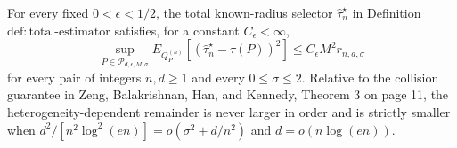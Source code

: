For every fixed \(0<\epsilon<1/2\), the total known-radius selector \(\widehat\tau_n^{\star}\) in Definition~\(\mathrm{def:total\text{-}estimator}\) satisfies, for a constant \(C_{\epsilon}<\infty\),
\[
 \sup_{P\in\mathcal P_{d,\epsilon,M,\sigma}}
 E_{Q_P^{(n)}}[(\widehat\tau_n^{\star}-\tau(P))^2]
 \le C_{\epsilon}M^2r_{n,d,\sigma}
\]
for every pair of integers \(n,d\ge1\) and every \(0\le\sigma\le2\).  Relative to the collision guarantee in Zeng, Balakrishnan, Han, and Kennedy, Theorem 3 on page 11, the heterogeneity-dependent remainder is never larger in order and is strictly smaller when \(d^2/[n^2\log^2(en)]=o(\sigma^2+d/n^2)\) and \(d=o(n\log(en))\).